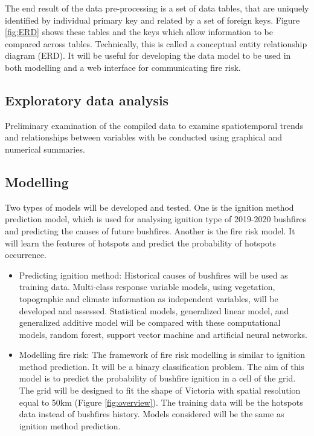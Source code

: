 \documentclass[11pt,a4paper,]{article}
\begin{document}
The end result of the data pre-processing is a set of data tables, that are uniquely identified by individual primary key and related by a set of foreign keys. Figure \ref{fig:ERD} shows these tables and the keys which allow information to be compared across tables. Technically, this is called a conceptual entity relationship diagram (ERD). It will be useful for developing the data model to be used in both modelling and a web interface for communicating fire risk.

\hypertarget{exploratory-data-analysis}{%
\subsection{Exploratory data analysis}\label{exploratory-data-analysis}}

Preliminary examination of the compiled data to examine spatiotemporal trends and relationships between variables with be conducted using graphical and numerical summaries.

\hypertarget{modelling}{%
\subsection{Modelling}\label{modelling}}

Two types of models will be developed and tested. One is the ignition method prediction model, which is used for analysing ignition type of 2019-2020 bushfires and predicting the causes of future bushfires. Another is the fire risk model. It will learn the features of hotspots and predict the probability of hotspots occurrence.

\begin{itemize}
\item
  Predicting ignition method: Historical causes of bushfires will be used as training data. Multi-class response variable models, using vegetation, topographic and climate information as independent variables, will be developed and assessed. Statistical models, generalized linear model, and generalized additive model will be compared with these computational models, random forest, support vector machine and artificial neural networks.
\item
  Modelling fire risk: The framework of fire risk modelling is similar to ignition method prediction. It will be a binary classification problem. The aim of this model is to predict the probability of bushfire ignition in a cell of the grid. The grid will be designed to fit the shape of Victoria with spatial resolution equal to 50km (Figure \ref{fig:overview}). The training data will be the hotspots data instead of bushfires history. Models considered will be the same as ignition method prediction.
\end{itemize}
\end{document}
